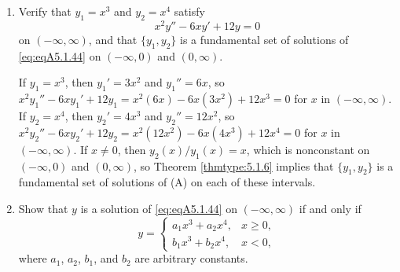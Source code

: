 \documentclass{ximera}
\begin{document}
\begin{problem}\label{exer:5.1.44}
\begin{enumerate}
\item %
Verify  that $y_1=x^3$ and $y_2=x^4$ satisfy
\begin{equation}\label{eq:eqA5.1.44}
x^2y''-6xy'+12y=0
\end{equation}
on $(-\infty,\infty)$, and that $\{y_1,y_2\}$ is a fundamental set of
solutions of \ref{eq:eqA5.1.44} on $(-\infty,0)$ and
$(0,\infty)$.

\begin{solution}
     If $y_1=x^3$, then $y_1'=3x^2$ and $y_1''=6x$, so
$x^2y_1''-6xy_1'+12y_1=x^2(6x)-6x(3x^2)+12x^3=0$
for $x$ in $(-\infty,\infty)$.
 If $y_2=x^4$, then $y_2'=4x^3$ and $y_2''=12x^2$, so
$x^2y_2''-6xy_2'+12y_2=x^2(12x^2)-6x(4x^3)+12x^4=0$
for $x$ in $(-\infty,\infty)$.
If $x\ne0$, then $y_2(x)/y_1(x)=x$, which
is nonconstant on $(-\infty,0)$ and $(0,\infty)$, so
Theorem \ref{thmtype:5.1.6} implies that  $\{y_1,y_2\}$ is a fundamental
set of solutions of (A) on each of these intervals.
\end{solution}
\item %
Show that
$y$ is a solution of  \ref{eq:eqA5.1.44} on $(-\infty,\infty)$
if and only if
$$
y=\left\{\begin{array}{rr}
a_1x^3+a_2x^4,&x\ge 0,\\
b_1x^3+b_2x^4,&x<0,
\end{array}\right.
$$
where $a_1$, $a_2$, $b_1$, and $b_2$  are arbitrary constants.


\end{enumerate}
\end{problem}
\end{document}
